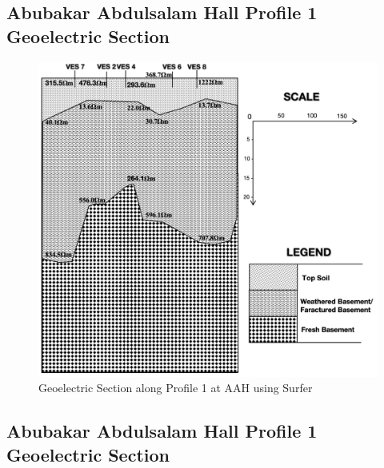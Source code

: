 \documentclass[12pt,a4paper]{report}
\begin{document}
\subsection{Abubakar Abdulsalam Hall Profile 1 Geoelectric Section}
\begin{figure}[H]
    \centering
    \includegraphics[width=1.0\textwidth]{AAH_PROFILE_1.png}
    \caption{Geoelectric Section along Profile 1 at AAH using Surfer}
    \label{fig:AAH_Surfer_Profile_1}
\end{figure}

\subsection{Abubakar Abdulsalam Hall Profile 1 Geoelectric Section}
\end{document}
